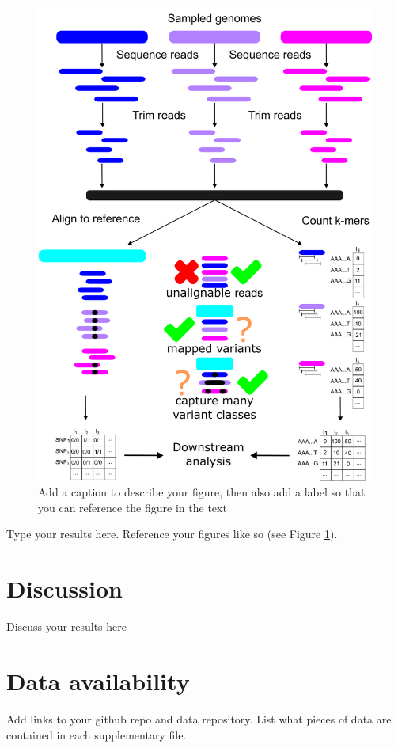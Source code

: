 \documentclass[10pt,letterpaper]{article}
\begin{document}
\begin{figure}[!h]
\centering
\includegraphics[width=0.8\linewidth]{figures/main/a_main_figure.png}
\caption{Add a caption to describe your figure, then also add a label so that you can reference the figure in the text}%
\label{fig:logo}
\end{figure}

Type your results here. Reference your figures like so (see Figure \ref{fig:logo}).

\section*{Discussion}

Discuss your results here

\section*{Data availability}

Add links to your github repo and data repository. List what pieces of data are contained in each supplementary file.
\end{document}
